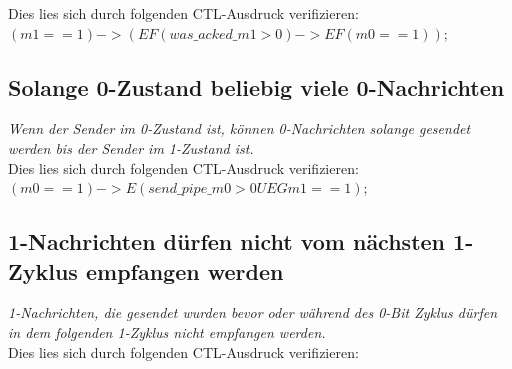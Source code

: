 \documentclass[]{scrartcl}
\begin{document}
Dies lies sich durch folgenden CTL-Ausdruck verifizieren: \\

$(m1 == 1) -> (EF (was\_acked\_m1 > 0) -> EF (m0 == 1));$

\subsection{Solange 0-Zustand beliebig viele 0-Nachrichten}

\textit{Wenn der Sender im 0-Zustand ist, können 0-Nachrichten solange gesendet werden bis der
Sender im 1-Zustand ist.}\\

Dies lies sich durch folgenden CTL-Ausdruck verifizieren: \\

$(m0 == 1) -> E(send\_pipe\_m0 > 0  U EG m1 == 1);$

\subsection{1-Nachrichten dürfen nicht vom nächsten 1-Zyklus empfangen werden}

\textit{1-Nachrichten, die gesendet wurden bevor oder während des 0-Bit Zyklus dürfen in dem
folgenden 1-Zyklus nicht empfangen werden.}\\

Dies lies sich durch folgenden CTL-Ausdruck verifizieren: \\
\end{document}
